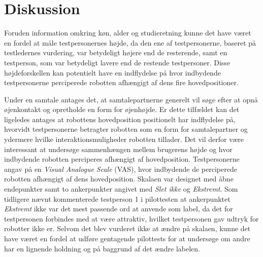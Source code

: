 \section*{Diskussion}
\label{Diskussion}
%
Foruden information omkring køn, alder og studieretning kunne det have været en fordel at måle testpersonernes højde, da den ene af testpersonerne, baseret på testledernes vurdering, var betydeligt højere end de resterende, samt en testperson, som var betydeligt lavere end de restende testpersoner. Disse højdeforskellen kan potentielt have en indflydelse på hvor indbydende testpersonerne perciperede robotten afhængigt af dens fire hovedpositioner. 

Under en samtale antages det, at samtalepartnerne generelt vil søge efter at opnå øjenkontakt og opretholde en form for øjenhøjde. Er dette tilfældet kan det ligeledes antages at robottens hovedposition positionelt har indflydelse på, hvorvidt testpersonerne betragter robotten som en form for samtalepartner og ydermere hvilke interaktionsmuligheder robotten tillader. Det vil derfor være interessant at undersøge sammenhængen mellem brugerens højde og hvor indbydende robotten perciperes afhængigt af hovedposition.\blankline  
%
Testpersonerne angav på en \textit{Visual Analogue Scale} (VAS), hvor indbydende de perciperede robotten afhængigt af dens hovedposition. Skalaen var designet med åbne endepunkter samt to ankerpunkter angivet med \textit{Slet ikke} og \textit{Ekstremt}. Som tidligere nævnt kommenterede testperson 1 i pilottesten at ankerpunktet \textit{Ekstremt} ikke var det mest passende ord at anvende som label, da det for testpersonen forbindes med at være attraktiv, hvilket testpersonen gav udtryk for robotter ikke er. Selvom det blev vurderet ikke at ændre på skalaen, kunne det have været en fordel at udføre gentagende pilottests for at undersøge om andre har en lignende holdning og på baggrund af det ændre labelen.    

